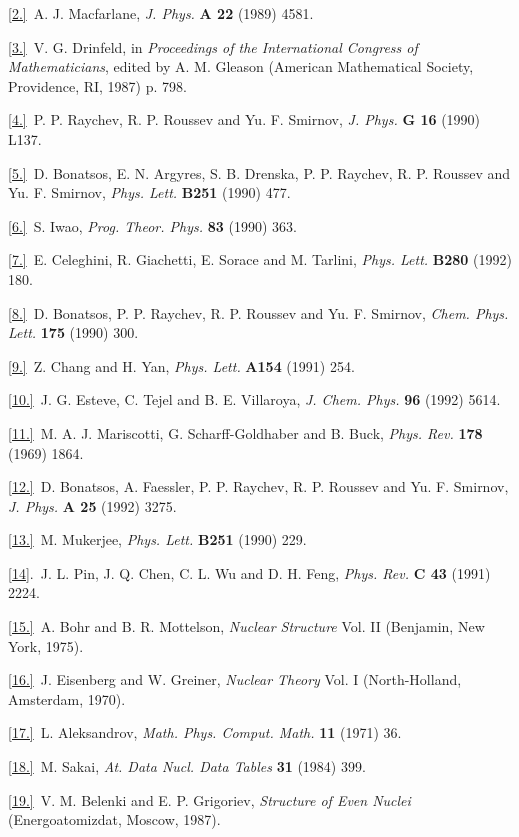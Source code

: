 \ref {2.}\ A. J. Macfarlane, {\it J. Phys.} {\bf A 22} (1989) 4581.

\ref {3.}\ V. G. Drinfeld,  in {\it Proceedings of the  International
         Congress of Mathematicians}, edited by  A. M. Gleason
         (American Mathematical Society, Providence, RI, 1987) p. 798.

\ref {4.}\ P. P. Raychev, R. P. Roussev and Yu. F. Smirnov, {\it J.
         Phys.} {\bf G 16} (1990) L137.

\ref {5.}\ D. Bonatsos, E. N. Argyres, S. B. Drenska, P. P.
         Raychev, R. P. Roussev and Yu. F. Smirnov, {\it Phys. Lett.} {\bf
         B251} (1990) 477.

\ref {6.}\ S. Iwao, {\it Prog. Theor. Phys.} {\bf 83} (1990) 363.

\ref {7.}\ E. Celeghini, R. Giachetti, E. Sorace and
         M. Tarlini, {\it Phys. Lett.} {\bf B280} (1992) 180.

\ref {8.}\ D. Bonatsos, P. P. Raychev, R. P. Roussev and Yu. F. Smirnov,
{\it Chem. Phys. Lett.} {\bf 175} (1990) 300.

\ref {9.}\ Z. Chang and H. Yan, {\it Phys. Lett.} {\bf A154} (1991) 254.

\ref {10.}\ J. G. Esteve, C. Tejel and B. E. Villaroya, {\it J. Chem. Phys.}
{\bf 96} (1992) 5614.

\ref {11.}\ M. A. J. Mariscotti, G. Scharff-Goldhaber and B. Buck, {\it Phys.
Rev.} {\bf 178} (1969) 1864.

\ref {12.}\ D. Bonatsos, A. Faessler, P. P. Raychev, R. P. Roussev and Yu. F.
Smirnov, {\it J. Phys.} {\bf A 25} (1992) 3275.

\ref {13.}\ M. Mukerjee, {\it Phys. Lett.} {\bf B251} (1990) 229.

\ref {14}.\ J. L. Pin, J. Q. Chen, C. L. Wu and D. H. Feng, {\it Phys. Rev.}
{\bf C 43} (1991) 2224.

\ref {15.}\ A. Bohr and B. R. Mottelson, {\it Nuclear Structure} Vol. II
(Benjamin, New York, 1975).

\ref {16.}\ J. Eisenberg and W. Greiner, {\it Nuclear Theory} Vol. I
(North-Holland, Amsterdam, 1970).

\ref {17.}\ L. Aleksandrov, {\it Math. Phys. Comput. Math.} {\bf 11} (1971) 36.

\ref {18.}\ M. Sakai, {\it At. Data Nucl. Data Tables} {\bf 31} (1984) 399.

\ref {19.}\ V. M. Belenki and E. P. Grigoriev, {\it Structure of
         Even Nuclei} (Energoatomizdat, Moscow, 1987).

